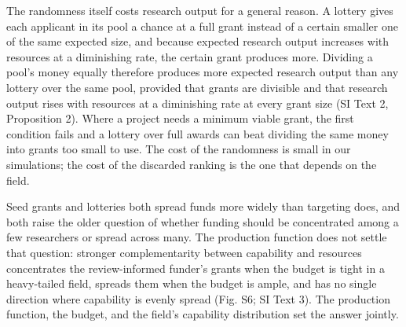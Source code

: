 \documentclass[9pt,twocolumn,twoside]{pnas-new}
\begin{document}
The randomness itself costs research output for a general reason. A lottery gives each applicant in its pool a chance at a full grant instead of a certain smaller one of the same expected size, and because expected research output increases with resources at a diminishing rate, the certain grant produces more. Dividing a pool's money equally therefore produces more expected research output than any lottery over the same pool, provided that grants are divisible and that research output rises with resources at a diminishing rate at every grant size (SI Text 2, Proposition 2). Where a project needs a minimum viable grant, the first condition fails and a lottery over full awards can beat dividing the same money into grants too small to use. The cost of the randomness is small in our simulations; the cost of the discarded ranking is the one that depends on the field.

Seed grants and lotteries both spread funds more widely than targeting does, and both raise the older question of whether funding should be concentrated among a few researchers or spread across many. The production function does not settle that question: stronger complementarity between capability and resources concentrates the review-informed funder's grants when the budget is tight in a heavy-tailed field, spreads them when the budget is ample, and has no single direction where capability is evenly spread (Fig. S6; SI Text 3). The production function, the budget, and the field's capability distribution set the answer jointly.


\end{document}

